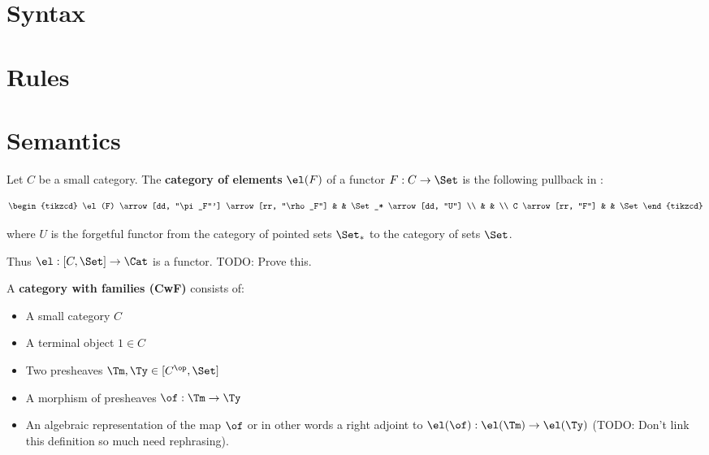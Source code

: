 
\section{Syntax}

\section{Rules}

\section{Semantics}

\begin{defin}
	Let $C$ be a small category. The {\bf category of elements} $\el(F)$ of a functor 
	$F : C \to \Set$ is the following pullback in \Cat:
	
	\begin{equation}
		\begin{tikzcd}
			\el(F) \arrow[dd, "\pi_F"'] \arrow[rr, "\rho_F"] &  & \Set_* \arrow[dd, "U"] \\
			&  &  \\
			C \arrow[rr, "F"] &  & \Set
		\end{tikzcd}
	\end{equation}

	where $U$ is the forgetful functor from the category of pointed sets 
	$\Set_*$ to the category of sets $\Set$.
\end{defin}
Thus $\el : [C, \Set] \to \Cat$ is a functor. TODO: Prove this.


\begin{defin}
	A {\bf category with families (CwF)} consists of:
	\begin{itemize}
		\item A small category $C$
		\item A terminal object $1 \in C$
		\item Two presheaves $\Tm, \Ty \in [C^\op, \Set]$
		\item A morphism of presheaves $\of : \Tm \to \Ty$
		\item An algebraic representation of the map $\of$ or in other words
		a right adjoint to $\el(\of) : \el(\Tm) \to \el(\Ty)$ (TODO: Don't link 
		this definition so much need rephrasing).
	\end{itemize}
\end{defin}


